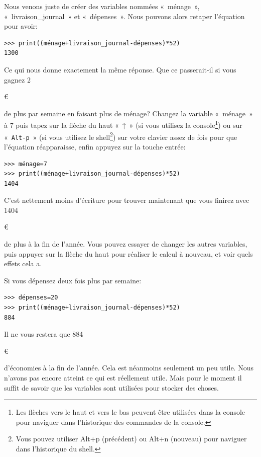 Nous venons juste de créer des variables nommées «~ménage~», «~livraison\_journal~» et «~dépenses~». Nous pouvons alors retaper l'équation pour avoir: \\


\begin{Verbatim}[frame=single,rulecolor=\color{mbleu}, label=à taper]
>>> print((ménage+livraison_journal-dépenses)*52)
1300
\end{Verbatim} 

Ce qui nous donne exactement la même réponse. Que ce passerait-il si vous gagnez 
2\begin{small}\euro\end{small} de plus par semaine en faisant plus de ménage? Changez la variable «~ménage~» à 7 puis tapez sur la flèche du haut «~↑~» (si vous utilisez la console\footnote{Les flèches vers le haut et vers le bas peuvent être utilisées dans la console pour naviguer dans l'historique des commandes de la console.}) ou sur «~\texttt{Alt-p}~» (si vous utilisez le shell\footnote{Vous pouvez utiliser Alt+p (précédent) ou Alt+n (nouveau) pour naviguer dans l'historique du shell.}) sur votre clavier assez de fois pour que l'équation réapparaisse, enfin appuyez sur la touche entrée:\\


\begin{Verbatim}[frame=single,rulecolor=\color{mbleu}, label=à taper]
>>> ménage=7
>>> print((ménage+livraison_journal-dépenses)*52)
1404
\end{Verbatim} 

C'est nettement moins d'écriture pour trouver maintenant que vous finirez avec 1404\begin{small}\euro\end{small} de plus à la fin de l'année. Vous pouvez essayer de changer les autres variables, puis appuyer sur la flèche du haut pour réaliser le calcul à nouveau, et voir quels effets cela a.

Si vous dépensez deux fois plus par semaine:\\


\begin{Verbatim}[frame=single,rulecolor=\color{mbleu}, label=à taper]
>>> dépenses=20
>>> print((ménage+livraison_journal-dépenses)*52)
884
\end{Verbatim}
 

Il ne vous restera que 884\begin{small}\euro\end{small} d'économies à la fin de l'année. Cela est néanmoins seulement un peu utile. Nous n'avons pas encore atteint ce qui est réellement utile. Mais pour le moment il suffit de savoir que les variables sont utilisées pour stocker des choses.\\

